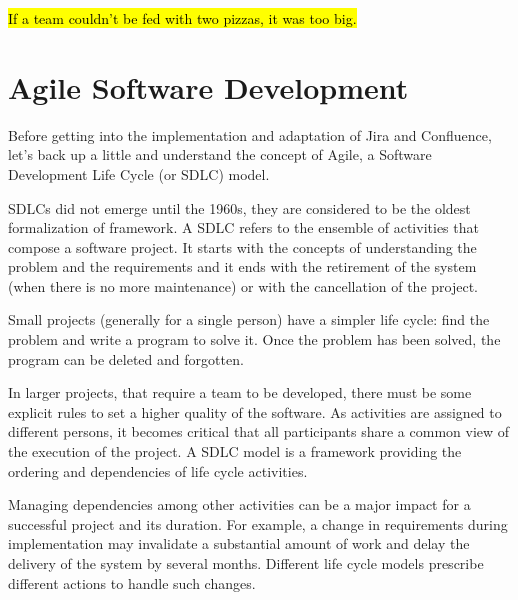 \begin{savequote}[75mm]
\hl{If a team couldn’t be fed with two pizzas, it was too big.}
\end{savequote}


\chapter{Agile Software Development}

Before getting into the implementation and adaptation of Jira and Confluence, let's back up a little and understand the concept of Agile, a Software Development Life Cycle (or SDLC) model.

SDLCs did not emerge until the 1960s, they are considered to be the oldest formalization of framework.
A SDLC refers to the ensemble of activities that compose a software project.
It starts with the concepts of understanding the problem and the requirements and it ends with the retirement of the system (when there is no more maintenance) or with the cancellation of the project.

Small projects (generally for a single person) have a simpler life cycle: find the problem and write a program to solve it.
Once the problem has been solved, the program can be deleted and forgotten.

In larger projects, that require a team to be developed, there must be some explicit rules to set a higher quality of the software.
As activities are assigned to different persons, it becomes critical that all participants share a common view of the execution of the project.
A SDLC model is a framework providing the ordering and dependencies of life cycle activities. 

Managing dependencies among other activities can be a major impact for a successful project and its duration. 
For example, a change in requirements during implementation may invalidate a substantial amount of work and delay the delivery of the system by several months.
Different life cycle models prescribe different actions to handle such changes.

